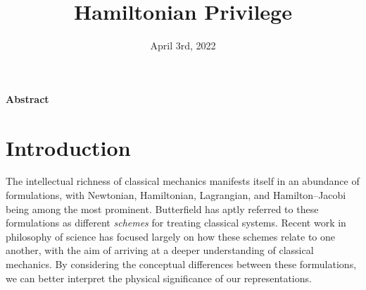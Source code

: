 \documentclass[12pt, twoside]{article}
\newcommand\bs{\begin{singlespace}}
\newcommand\es{\end{singlespace}}
\begin{document}
\title{\vspace{-3em} \LARGE Hamiltonian Privilege}			
\date{\vspace{-7.9ex} April 3rd, 2022}
\maketitle
%
\vspace{-8mm}

\bs
\begin{flushleft}{\large \textbf{Abstract}}\end{flushleft}

\es


\bs
\tableofcontents 
\es



\section{Introduction}
\label{introduction}


The intellectual richness of classical mechanics manifests itself in an abundance of formulations, with Newtonian, Hamiltonian, Lagrangian, and Hamilton--Jacobi being among the most prominent.  Butterfield \parencites*[]{Butterfield2004} has aptly referred to these formulations as different \textit{schemes} for treating classical systems. Recent work in philosophy of science has focused largely on how these schemes relate to one another, with the aim of arriving at a deeper understanding of classical mechanics. By considering the conceptual differences between these formulations, we can better interpret the physical significance of our representations.
\end{document}
